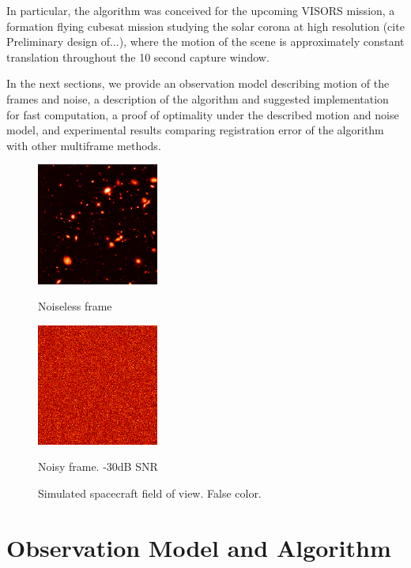 \documentclass{article}
\begin{document}
In particular, the algorithm was conceived for the upcoming VISORS mission, a formation flying cubesat mission studying the solar corona at high resolution (cite Preliminary design of...), where the motion of the scene is approximately constant translation throughout the 10 second capture window.

In the next sections, we provide an observation model describing motion of the frames and noise, a description of the algorithm and suggested implementation for fast computation, a proof of optimality under the described motion and noise model, and experimental results comparing registration error of the algorithm with other multiframe methods.

\begin{figure}[htb]
\begin{minipage}[b]{.48\linewidth}
  \centering
  \centerline{\includegraphics[width=4.0cm]{images/frame_clean.png}}
  \centerline{Noiseless frame}\medskip
\end{minipage}
\hfill
\begin{minipage}[b]{0.48\linewidth}
  \centering
  \centerline{\includegraphics[width=4.0cm]{images/frame.png}}
  \centerline{Noisy frame. -30dB SNR}\medskip
\end{minipage}
  \caption{Simulated spacecraft field of view.  False color.}
\label{fig:scene}
\end{figure}


\section{Observation Model and Algorithm}
\label{sec:algorithm}
\end{document}
